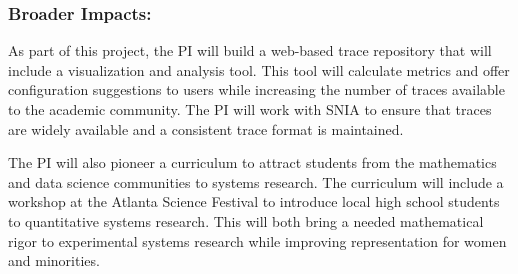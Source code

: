 \subsubsection*{Broader Impacts: }
As part of this project, the PI will build a 
web-based trace repository that will include a visualization and analysis tool. This tool will calculate metrics and
offer configuration suggestions to users while increasing the number
of traces available to the academic community.  The PI will work with SNIA to ensure that traces are widely available and a consistent trace format is maintained.

The PI will also pioneer a curriculum to attract students from the mathematics and data science communities to systems research.  The curriculum will include a workshop at the Atlanta Science Festival to introduce local high school students to quantitative systems research.  This will both bring a needed mathematical rigor to experimental systems research while improving representation for women and minorities.%




